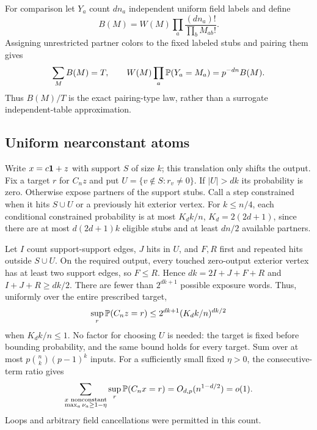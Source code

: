 For comparison let $Y_a$ count $dn_a$ independent uniform field
labels and define
\[
 B(M)=W(M)\prod_a\frac{(dn_a)!}{\prod_bM_{ab}!}.
\]
Assigning unrestricted partner colors to the fixed labeled stubs and
pairing them gives
\begin{equation}\label{eq:config-baseline}
 \sum_M B(M)=T,\qquad
 W(M)\prod_a\mathbb P(Y_a=M_a)=p^{-dn}B(M).
\end{equation}
Thus $B(M)/T$ is the exact pairing-type law, rather than a surrogate
independent-table approximation.

\subsection{Uniform nearconstant atoms}
Write $x=c\mathbf 1+z$ with support $S$ of size $k$; this translation
only shifts the output. Fix a target $r$ for $C_nz$ and put
$U=\{v\notin S:r_v\ne0\}$. If $|U|>dk$ its probability is zero.
Otherwise expose partners of the support stubs. Call a step constrained
when it hits $S\cup U$ or a previously hit exterior vertex.
For $k\le n/4$, each conditional constrained probability is at most
$K_dk/n$, $K_d=2(2d+1)$, since there are at most
$d(2d+1)k$ eligible stubs and at least $dn/2$ available partners.

Let $I$ count support-support edges, $J$ hits in $U$, and $F,R$
first and repeated hits outside $S\cup U$. On the required output,
every touched zero-output exterior vertex has at least two support
edges, so $F\le R$. Hence
$dk=2I+J+F+R$ and $I+J+R\ge dk/2$.
There are fewer than $2^{dk+1}$ possible exposure words. Thus,
uniformly over the entire prescribed target,
\begin{equation}\label{eq:config-near-atom}
 \sup_r\mathbb P(C_nz=r)
 \le2^{dk+1}(K_dk/n)^{dk/2}
\end{equation}
when $K_dk/n\le1$. No factor for choosing $U$ is needed: the target
is fixed before bounding probability, and the same bound holds for
every target. Sum over at most $p\binom nk(p-1)^k$ inputs. For a
sufficiently small fixed $\eta>0$, the consecutive-term ratio gives
\begin{equation}\label{eq:config-near-total}
 \sum_{\substack{x\text{ nonconstant}\\\max_a\nu_a\ge1-\eta}}
     \sup_r\mathbb P(C_nx=r)=O_{d,p}(n^{1-d/2})=o(1).
\end{equation}
Loops and arbitrary field cancellations were permitted in this count.

